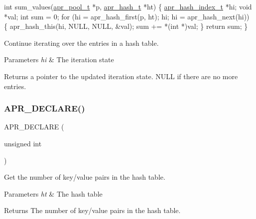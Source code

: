 \begin{DoxyCode}
\textcolor{keywordtype}{int} sum\_values(\mbox{\hyperlink{group__apr__pools_gaf137f28edcf9a086cd6bc36c20d7cdfb}{apr\_pool\_t}} *p, \mbox{\hyperlink{group__apr__hash_ga72ec09b8bde6d874c36bd49df915fff6}{apr\_hash\_t}} *ht)
\{
    \mbox{\hyperlink{group__apr__hash_ga3b3d353989f6cea4535630634be147f7}{apr\_hash\_index\_t}} *hi;
    \textcolor{keywordtype}{void} *val;
    \textcolor{keywordtype}{int} sum = 0;
    \textcolor{keywordflow}{for} (hi = apr\_hash\_first(p, ht); hi; hi = apr\_hash\_next(hi)) \{
        apr\_hash\_this(hi, NULL, NULL, &val);
        sum += *(\textcolor{keywordtype}{int} *)val;
    \}
    \textcolor{keywordflow}{return} sum;
\}
\end{DoxyCode}


Continue iterating over the entries in a hash table. 
\begin{DoxyParams}{Parameters}
{\em hi} & The iteration state \\
\hline
\end{DoxyParams}
\begin{DoxyReturn}{Returns}
a pointer to the updated iteration state. N\+U\+LL if there are no more ~\newline
 entries. 
\end{DoxyReturn}
\mbox{\label{group__apr__hash_gaf86c4ba2e44173e928ccf1e251f3aeee}} 
\subsubsection{\texorpdfstring{A\+P\+R\+\_\+\+D\+E\+C\+L\+A\+R\+E()}{APR\_DECLARE()}\hspace{0.1cm}{\footnotesize\ttfamily [5/6]}}
{\footnotesize\ttfamily A\+P\+R\+\_\+\+D\+E\+C\+L\+A\+RE (\begin{DoxyParamCaption}\item[{unsigned}]{int }\end{DoxyParamCaption})}

Get the number of key/value pairs in the hash table. 
\begin{DoxyParams}{Parameters}
{\em ht} & The hash table \\
\hline
\end{DoxyParams}
\begin{DoxyReturn}{Returns}
The number of key/value pairs in the hash table. 
\end{DoxyReturn}
\mbox{\label{group__apr__hash_gac18b30b00f6ca75fb8e99343e5aa4943}} 
